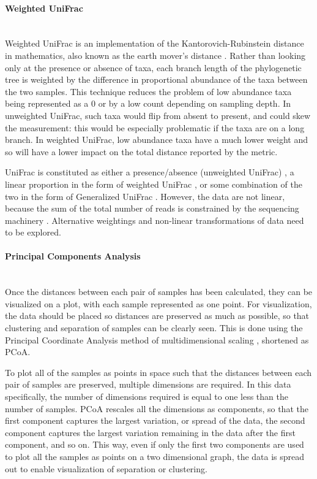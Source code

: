\FloatBarrier

\paragraph{Weighted UniFrac}\mbox{}\\
Weighted UniFrac is an implementation of the Kantorovich-Rubinstein distance in mathematics, also known as the earth mover's distance \cite{evans2012phylogenetic}. Rather than looking only at the presence or absence of taxa, each branch length of the phylogenetic tree is weighted by the difference in proportional abundance of the taxa between the two samples. This technique reduces the problem of low abundance taxa being represented as a 0 or by a low count depending on sampling depth. In unweighted UniFrac, such taxa would flip from absent to present, and could skew the measurement: this would be especially problematic if the taxa are on a long branch. In weighted UniFrac, low abundance taxa have a much lower weight and so will have a lower impact on the total distance reported by the metric.

UniFrac is constituted as either a presence/absence (unweighted UniFrac) \cite{lozupone2005unifrac}, a linear proportion in the form of weighted UniFrac \cite{lozupone2007quantitative}, or some combination of the two in the form of Generalized UniFrac \cite{chen2012associating}. However, the data are not linear, because the sum of the total number of reads is constrained by the sequencing machinery \cite{friedman2012inferring}. Alternative weightings and non-linear transformations of data need to be explored.

\paragraph{Principal Components Analysis}\mbox{}\\
Once the distances between each pair of samples has been calculated, they can be visualized on a plot, with each sample represented as one point. For visualization, the data should be placed so distances are preserved as much as possible, so that clustering and separation of samples can be clearly seen. This is done using the Principal Coordinate Analysis method of multidimensional scaling \cite{dollhopf2001interpreting}, shortened as PCoA.

To plot all of the samples as points in space such that the distances between each pair of samples are preserved, multiple dimensions are required. In this data specifically, the number of dimensions required is equal to one less than the number of samples. PCoA rescales all the dimensions as components, so that the first component captures the largest variation, or spread of the data, the second component captures the largest variation remaining in the data after the first component, and so on. This way, even if only the first two components are used to plot all the samples as points on a two dimensional graph, the data is spread out to enable visualization of separation or clustering.

